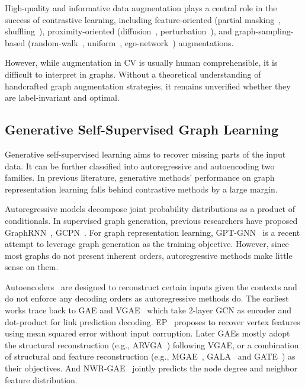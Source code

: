 High-quality and informative data augmentation plays a central role in the success of contrastive learning, 
including feature-oriented (partial masking~\cite{jin2020self,hu2020strategies,you2020graph,zhu2020deep,thakoor2021bootstrapped}, shuffling~\cite{velivckovic2018deep}), proximity-oriented (diffusion~\cite{hassani2020contrastive,kefato2021self}, perturbation~\cite{you2020graph,hu2020gpt,zeng2020contrastive}), and graph-sampling-based (random-walk~\cite{qiu2020gcc,hassani2020contrastive,you2020graph}, uniform~\cite{zeng2020contrastive}, ego-network~\cite{sterling2015zinc}) augmentations. 

However, while augmentation in CV is usually human comprehensible, it is difficult to interpret in graphs. 
Without a theoretical understanding of handcrafted graph augmentation strategies, it remains unverified whether they are label-invariant and optimal. 

\subsection{Generative Self-Supervised Graph Learning}
Generative self-supervised learning aims to recover missing parts of the input data. 
It can be further classified into autoregressive and autoencoding two families. 
In previous literature, generative methods' performance on graph representation learning falls behind contrastive methods by a large margin.

Autoregressive models decompose joint probability distributions as a product of conditionals. 
In supervised graph generation, previous researchers have proposed GraphRNN~\cite{you2018graphrnn}, GCPN~\cite{you2018graph}. 
For graph representation learning, GPT-GNN~\cite{hu2020gpt} is a recent attempt to leverage graph generation as the training objective. 
However, since most graphs do not present inherent orders, autoregressive methods make little sense on them.

Autoencoders~\cite{hinton1994autoencoders} are designed to reconstruct certain inputs given the contexts and do not enforce any decoding orders as autoregressive methods do. 
The earliest works trace back to GAE and VGAE~\cite{kipf2016variational} which take 2-layer GCN as encoder and dot-product for link prediction decoding. EP~\cite{garcia2017learning} proposes to recover vertex features using mean squared error without input corruption. 
Later GAEs mostly adopt the structural reconstruction (e.g., ARVGA~\cite{pan2018adversarially}) following VGAE, or a combination of structural and feature reconstruction (e.g., MGAE~\cite{wang2017mgae}, GALA~\cite{park2019symmetric} and GATE~\cite{amin2020gate}) as their objectives. And NWR-GAE~\cite{tang2022graph} jointly predicts the node degree and neighbor feature distribution.

